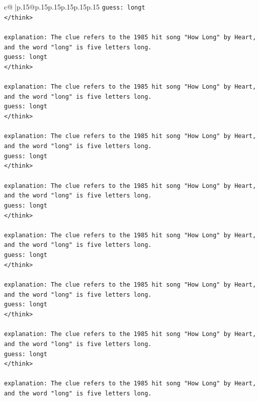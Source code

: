 \documentclass{article}
\begin{document}
{\begin{supertabular}{c@{$\;$}|p{.15\linewidth}@{}p{.15\linewidth}p{.15\linewidth}p{.15\linewidth}p{.15\linewidth}p{.15\linewidth}}
{{{\texttt{guess: longt} \\
\texttt{</think>} \\
\\ 
\texttt{explanation: The clue refers to the 1985 hit song "How Long" by Heart, and the word "long" is five letters long.} \\
\texttt{guess: longt} \\
\texttt{</think>} \\
\\ 
\texttt{explanation: The clue refers to the 1985 hit song "How Long" by Heart, and the word "long" is five letters long.} \\
\texttt{guess: longt} \\
\texttt{</think>} \\
\\ 
\texttt{explanation: The clue refers to the 1985 hit song "How Long" by Heart, and the word "long" is five letters long.} \\
\texttt{guess: longt} \\
\texttt{</think>} \\
\\ 
\texttt{explanation: The clue refers to the 1985 hit song "How Long" by Heart, and the word "long" is five letters long.} \\
\texttt{guess: longt} \\
\texttt{</think>} \\
\\ 
\texttt{explanation: The clue refers to the 1985 hit song "How Long" by Heart, and the word "long" is five letters long.} \\
\texttt{guess: longt} \\
\texttt{</think>} \\
\\ 
\texttt{explanation: The clue refers to the 1985 hit song "How Long" by Heart, and the word "long" is five letters long.} \\
\texttt{guess: longt} \\
\texttt{</think>} \\
\\ 
\texttt{explanation: The clue refers to the 1985 hit song "How Long" by Heart, and the word "long" is five letters long.} \\
\texttt{guess: longt} \\
\texttt{</think>} \\
\\ 
\texttt{explanation: The clue refers to the 1985 hit song "How Long" by Heart, and the word "long" is five letters long.} \\
}}}
\end{supertabular}}
\end{document}
